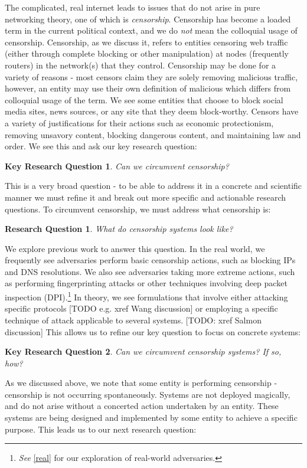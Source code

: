 \documentclass[12pt]{report}
\newtheorem{question}{Research Question}
\newtheorem*{keyq}{Key Research Question}
\begin{document}
The complicated, real internet leads to issues that do not arise in pure networking theory, one of which is \emph{censorship}. Censorship has become a loaded term in the current political context, and we do \emph{not} mean the colloquial usage of censorship. Censorship, as we discuss it, refers to entities censoring web traffic (either through complete blocking or other manipulation) at nodes (frequently routers) in the network(s) that they control. Censorship may be done for a variety of reasons - most censors claim they are solely removing malicious traffic, however, an entity may use their own definition of malicious which differs from colloquial usage of the term. We see some entities that choose to block social media sites, news sources, or any site that they deem block-worthy. Censors have a variety of justifications for their actions such as economic protectionism, removing unsavory content, blocking dangerous content, and maintaining law and order. We see this and ask our key research question:
\begin{keyq}
Can we circumvent censorship?
\end{keyq}
This is a very broad question - to be able to address it in a concrete and scientific manner we must refine it and break out more specific and actionable research questions. To circumvent censorship, we must address what censorship is:
\begin{question}
What do censorship systems look like?
\end{question}

We explore previous work to answer this question. In the real world, we frequently see adversaries perform basic censorship actions, such as blocking IPs and DNS resolutions. We also see adversaries taking more extreme actions, such as performing fingerprinting attacks or other techniques involving deep packet inspection (DPI).\footnote{\emph{See} \ref{real} for our exploration of real-world adversaries.} In theory, we see formulations that involve either attacking specific protocols [TODO e.g. xref Wang discussion] or employing a specific technique of attack applicable to several systems. [TODO: xref Salmon discussion] This allows us to refine our key question to focus on concrete systems:

\begin{keyq}
Can we circumvent censorship systems? If so, how?
\end{keyq}

As we discussed above, we note that some entity is performing censorship - censorship is not occurring spontaneously. Systems are not deployed magically, and do not arise without a concerted action undertaken by an entity. These systems are being designed and implemented by some entity to achieve a specific purpose. This leads us to our next research question:
\end{document}
